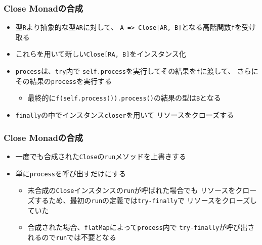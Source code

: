 \begin{frame}
  \frametitle{Close Monadの合成}

  

  \begin{itemize}
    \item<2-> 型\lstinline|R|より抽象的な型\lstinline|AR|に対して、
    \lstinline|A => Close[AR, B]|となる高階関数\lstinline|f|を受け取る
    \item<3-> これらを用いて新しい\lstinline|Close[RA, B]|をインスタンス化
    \item<4-> \lstinline|process|は、\lstinline|try|内で
    \lstinline|self.process|を実行してその結果を\lstinline|f|に渡して、
    さらにその結果の\lstinline|process|を実行する
    \begin{itemize}
      \item<5-> 最終的に\lstinline|f(self.process()).process()|の結果の型は\lstinline|B|となる
    \end{itemize}
    \item<6-> \lstinline|finally|の中でインスタンス\lstinline|closer|を用いて
    リソースをクローズする
  \end{itemize}
\end{frame}

\begin{frame}
  \frametitle{Close Monadの合成}

  

  \begin{itemize}
    \item<2-> 一度でも合成された\lstinline|Close|の\lstinline|run|メソッドを上書きする
    \item<3-> 単に\lstinline|process|を呼び出すだけにする
    \begin{itemize}
      \item<4-> 未合成の\lstinline|Close|インスタンスの\lstinline|run|が呼ばれた場合でも
      リソースをクローズするため、最初の\lstinline|run|の定義では\lstinline|try-finally|で
      リソースをクローズしていた
      \item<5-> 合成された場合、\lstinline|flatMap|によって\lstinline|process|内で
      \lstinline|try-finally|が呼び出されるので\lstinline|run|では不要となる
    \end{itemize}
  \end{itemize}
\end{frame}

